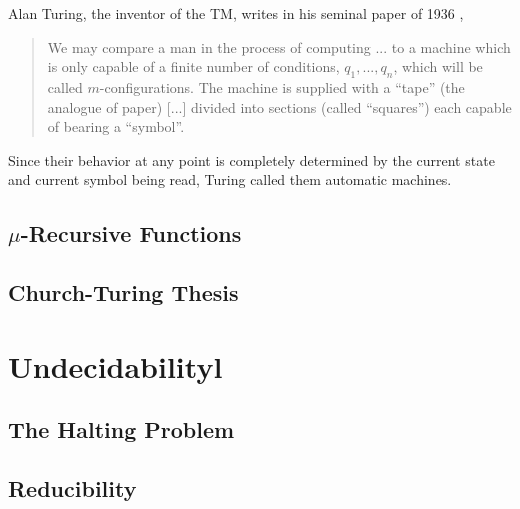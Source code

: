 \documentclass[english, 12pt]{article}
\begin{document}
 Alan Turing, the inventor of the TM, writes in his seminal paper of 1936 , 
 \begin{quote}We may compare a man in the process of computing \!...\!\! to a
                        machine which is only capable of a finite number of conditions,
                        $q_1, ..., q_n$, which will be called $m$-configurations.
                         The machine is supplied with a
                       ``tape'' (the analogue of paper) [...] divided into sections 
                       (called ``squares'') each capable of bearing a ``symbol''.
\end{quote}
Since their behavior at any point is completely determined  by the
current state and current symbol being read, Turing called them 
automatic machines. 


  \subsection{$\mu$-Recursive Functions}
  \subsection{Church-Turing Thesis}
  \section{Undecidabilityl}
  \subsection{The Halting Problem}
  \subsection{Reducibility}
  
\end{document}
